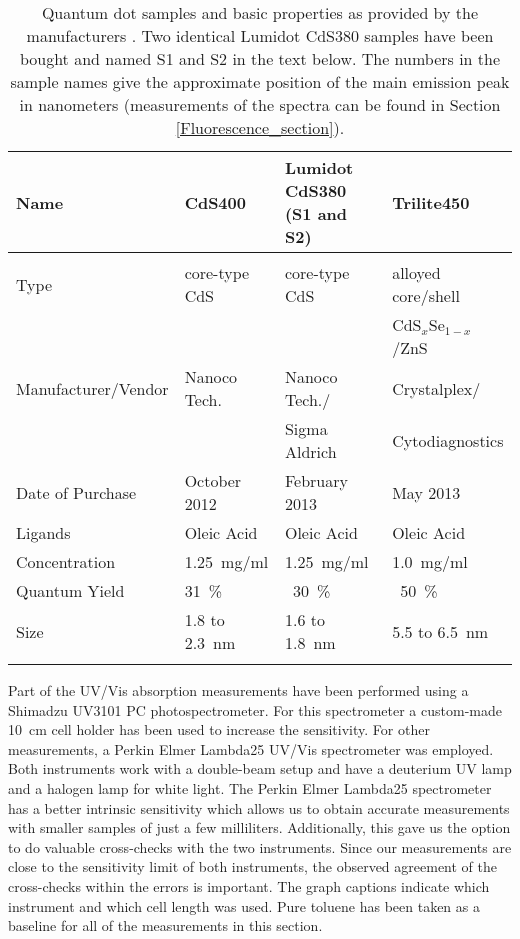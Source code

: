 \documentclass[cits]{JINST}
\begin{document}
\begin{table}[th]
\caption{Quantum dot samples and basic properties as provided by the manufacturers \cite{nanoco, sigma, cytodiagnostics, crystalplex}. Two identical Lumidot CdS380 samples have been bought and named S1 and S2 in the text below. The numbers in the sample names give the approximate position of the main emission peak in nanometers (measurements of the spectra can be found in Section \protect\ref{Fluorescence_section}).}
  \begin{center}
    \begin{tabular}{llll}
      Name & CdS400 & Lumidot CdS380 (S1 and S2)& Trilite450 \\
      \hline\hline\\[-5px]
      Type & core-type CdS & core-type CdS & alloyed core/shell \\ 
           &               &               & CdS$_x$Se$_{1-x}$/ZnS \\
      Manufacturer/Vendor & Nanoco Tech. & Nanoco Tech./ & Crystalplex/ \\
                          &              & Sigma Aldrich & Cytodiagnostics \\
      Date of Purchase & October 2012 & February 2013 & May 2013 \\
      Ligands & Oleic Acid & Oleic Acid & Oleic Acid \\
      Concentration & 1.25~mg/ml & 1.25~mg/ml & 1.0~mg/ml \\
      Quantum Yield & 31~\% & ~30~\%  & ~50~\% \\
      Size & 1.8 to 2.3~nm & 1.6 to 1.8~nm & 5.5 to 6.5~nm\\[5px] 
      \hline
    \label{samples_table}
    \end{tabular}
  \end{center}
\end{table}

Part of the UV/Vis absorption measurements have been performed using a Shimadzu UV3101 PC photospectrometer. For this spectrometer a custom-made 10~cm cell holder has been used to increase the sensitivity. For other measurements, a Perkin Elmer Lambda25 UV/Vis spectrometer was employed. Both instruments work with a double-beam setup and have a deuterium UV lamp and a halogen lamp for white light. The Perkin Elmer Lambda25 spectrometer has a better intrinsic sensitivity which allows us to obtain accurate measurements with smaller samples of just a few milliliters. Additionally, this gave us the option to do valuable cross-checks with the two instruments. Since our measurements are close to the sensitivity limit of both instruments, the observed agreement of the cross-checks within the errors is important. The graph captions indicate which instrument and which cell length was used. Pure toluene has been taken as a baseline for all of the measurements in this section. 
\end{document}
